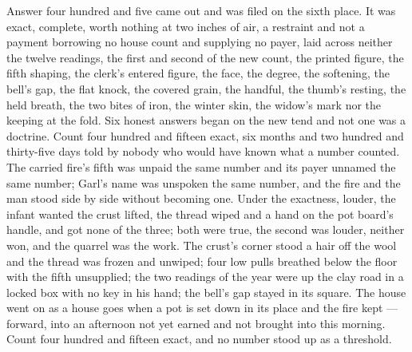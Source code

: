 Answer four hundred and five came out and was filed on the sixth place. It was exact, complete, worth nothing at two inches of air, a restraint and not a payment borrowing no house count and supplying no payer, laid across neither the twelve readings, the first and second of the new count, the printed figure, the fifth shaping, the clerk's entered figure, the face, the degree, the softening, the bell's gap, the flat knock, the covered grain, the handful, the thumb's resting, the held breath, the two bites of iron, the winter skin, the widow's mark nor the keeping at the fold. Six honest answers began on the new tend and not one was a doctrine. Count four hundred and fifteen exact, six months and two hundred and thirty-five days told by nobody who would have known what a number counted. The carried fire's fifth was unpaid the same number and its payer unnamed the same number; Garl's name was unspoken the same number, and the fire and the man stood side by side without becoming one. Under the exactness, louder, the infant wanted the crust lifted, the thread wiped and a hand on the pot board's handle, and got none of the three; both were true, the second was louder, neither won, and the quarrel was the work. The crust's corner stood a hair off the wool and the thread was frozen and unwiped; four low pulls breathed below the floor with the fifth unsupplied; the two readings of the year were up the clay road in a locked box with no key in his hand; the bell's gap stayed in its square. The house went on as a house goes when a pot is set down in its place and the fire kept --- forward, into an afternoon not yet earned and not brought into this morning. Count four hundred and fifteen exact, and no number stood up as a threshold.
